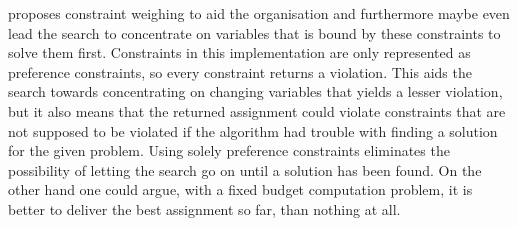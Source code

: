 \cite{AIRussell} proposes constraint weighing to aid the organisation and furthermore maybe even lead the search to concentrate on variables that is bound by these constraints to solve them first. Constraints in this implementation are only represented as preference constraints, so every constraint returns a violation. This aids the search towards concentrating on changing variables that yields a lesser violation, but it also means that the returned assignment could violate constraints that are not supposed to be violated if the algorithm had trouble with finding a solution for the given problem. Using solely preference constraints eliminates the possibility of letting the search go on until a solution has been found. On the other hand one could argue, with a fixed budget computation problem, it is better to deliver the best assignment so far, than nothing at all.
%
%
